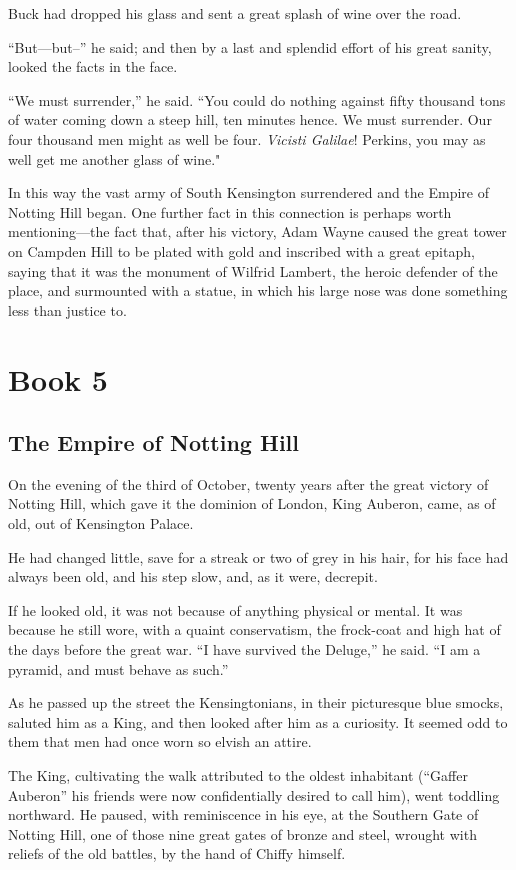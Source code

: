 \documentclass{book}
\begin{document}
Buck had dropped his glass and sent a great splash of wine over the road.

“But—but–” he said; and then by a last and splendid effort of his great sanity, looked the facts in the face.

“We must surrender,” he said. “You could do nothing against fifty thousand tons of water coming down a steep hill, ten minutes hence. We must surrender. Our four thousand men might as well be four. \emph{Vicisti Galilae}! Perkins, you may as well get me another glass of wine."

In this way the vast army of South Kensington surrendered and the Empire of Notting Hill began. One further fact in this connection is perhaps worth mentioning—the fact that, after his victory, Adam Wayne caused the great tower on Campden Hill to be plated with gold and inscribed with a great epitaph, saying that it was the monument of Wilfrid Lambert, the heroic defender of the place, and surmounted with a statue, in which his large nose was done something less than justice to.

\setcounter{chapter}{0}\part*{Book 5}
\label{chapter-16}
\chapter{The Empire of Notting Hill}
\label{chapter-17}
On the evening of the third of October, twenty years after the great victory of Notting Hill, which gave it the dominion of London, King Auberon, came, as of old, out of Kensington Palace.

He had changed little, save for a streak or two of grey in his hair, for his face had always been old, and his step slow, and, as it were, decrepit.

If he looked old, it was not because of anything physical or mental. It was because he still wore, with a quaint conservatism, the frock-coat and high hat of the days before the great war. “I have survived the Deluge,” he said. “I am a pyramid, and must behave as such.”

As he passed up the street the Kensingtonians, in their picturesque blue smocks, saluted him as a King, and then looked after him as a curiosity. It seemed odd to them that men had once worn so elvish an attire.

The King, cultivating the walk attributed to the oldest inhabitant (“Gaffer Auberon” his friends were now confidentially desired to call him), went toddling northward. He paused, with reminiscence in his eye, at the Southern Gate of Notting Hill, one of those nine great gates of bronze and steel, wrought with reliefs of the old battles, by the hand of Chiffy himself.
\end{document}
